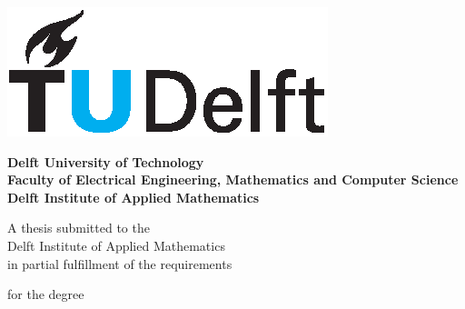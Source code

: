 \documentclass[a4paper,11pt]{book}
\theoremstyle{definition}
\begin{document}
\begin{titlepage}

\thispagestyle{empty}

{\hspace{10cm}
\begin{minipage}{5cm}
  \includegraphics{tudelft.eps}
\end{minipage}}

\begin{center}

\vspace{1.0cm}

\large
\textbf{\large{Delft University of Technology}} \\
\textbf{\large{Faculty of Electrical Engineering, Mathematics and Computer Science}} \\
\textbf{\large{Delft Institute of Applied Mathematics}}

\vspace{2.0cm}


\vspace{2.0cm}

\large A thesis submitted to the\\
Delft Institute of Applied Mathematics\\
in partial fulfillment of the requirements

\vspace{1.0cm}

for the degree\\

\vspace{1.0cm}


\end{center}
\end{titlepage}
\end{document}
